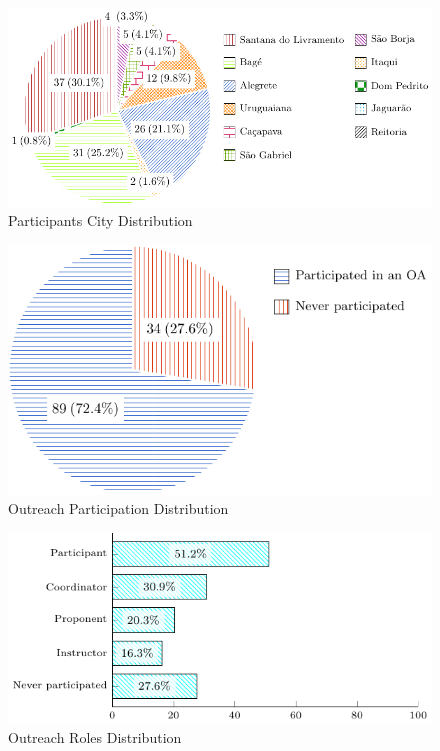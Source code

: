 \begin{figure}[!htb]
  \caption{Participants City Distribution}\label{fig:city-distribution}
  \begin{center}
    \includegraphics[width=.85\textwidth]{img/5-participants-city.pdf}
  \end{center}
\end{figure}

\begin{figure}[!htb]
  \caption{Outreach Participation Distribution}\label{fig:outreach-participation}
  \begin{center}
    \includegraphics[width=.65\textwidth]{img/5-outreach-participation.pdf}
  \end{center}
\end{figure}

\begin{figure}[!htb]
  \caption{Outreach Roles Distribution}\label{fig:outreach-roles}
  \begin{center}
    \includegraphics[width=13cm]{img/5-outreach-roles.pdf}
  \end{center}
\end{figure}

